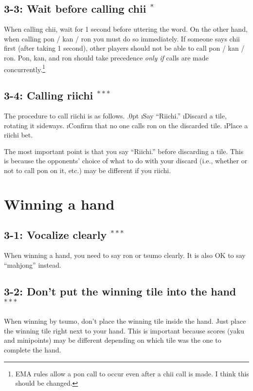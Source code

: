 \subsection*{3-3: Wait before calling {\jap chii} $^{*}$}
When calling {\jap chii}, wait for 1 second before uttering the word. On the other hand, when calling {\jap pon} / {\jap kan} / {\jap ron} you must do so immediately. If someone says {\jap chii} first (after taking 1 second), other players should not be able to call {\jap pon} / {\jap kan} / {\jap ron}. {\jap Pon}, {\jap kan}, and {\jap ron} should take precedence \emph{only if} calls are made concurrently.\footnote{EMA rules allow a {\jap pon} call to occur even after a {\jap chii} call is made. I think this should be changed.}

\subsection*{3-4: Calling riichi $^{***}$}
The procedure to call riichi is as follows.
\be\itemsep.0pt
\i Say ``{\jap Riichi}.''
\i Discard a tile, rotating it sideways.
\i Confirm that no one calls {\jap ron} on the discarded tile.
\i Place a riichi bet.
\ee

The most important point is that you say ``{\jap Riichi}.'' before discarding a tile. This is because the opponents' choice of what to do with your discard (i.e., whether or not to call {\jap pon} on it, etc.) may be different if you riichi.

\newpage
\section{Winning a hand}

\subsection*{3-1: Vocalize clearly $^{***}$}
When winning a hand, you need to say {\jap ron} or {\jap tsumo} clearly. It is also OK to say ``mahjong'' instead. 

\subsection*{3-2: Don't put the winning tile into the hand $^{***}$}
When winning by {\jap tsumo}, don't place the winning tile inside the hand. Just place the winning tile right next to your hand. This is important because scores ({\jap yaku} and minipoints) may be different depending on which tile was the one to complete the hand. 

